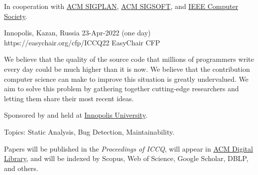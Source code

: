 \documentclass{../cfp}
\begin{document}
\PrintLogo{}



In cooperation
with
\href{https://www.sigplan.org}{ACM SIGPLAN},
\href{https://www.sigsoft.org}{ACM SIGSOFT},\newline
and
\href{https://conferences.ieee.org/conferences_events/conferences/conferencedetails/53703}{IEEE Computer Society}.

\vspace{6pt}

\PrintAddress
  {Innopolis, Kazan, Russia}
  {23-Apr-2022 (one day)}
  {https://easychair.org/cfp/ICCQ22}
  {EasyChair CFP}

\vspace{12pt}
%
%
%
\vspace{12pt}

We believe that the quality of the source code that millions of programmers
write every day could be much higher than it is now. We believe that the
contribution computer science can make to improve this situation is greatly
undervalued. We aim to solve this problem by gathering
together cutting-edge researchers and letting them share their most recent ideas.

Sponsored by and held at \href{https://innopolis.university/en/}{Innopolis University}.

Topics: Static Analysis, Bug Detection, Maintainability.

Papers will be published in the \textit{Proceedings of ICCQ},
will appear in \href{https://dl.acm.org/}{ACM Digital Library},
and will be indexed by Scopus, Web of Science, Google Scholar, DBLP, and others.
\end{document}
